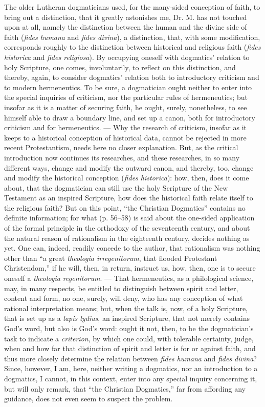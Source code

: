 \documentclass[12pt]{book}
\begin{document}
The older Lutheran dogmaticians used, for the many-sided conception of faith, to bring out a distinction, that it greatly astonishes me, Dr. M. has not touched upon at all, namely
the distinction between the human and the divine side of faith (\textit{fides humana} and \textit{fides divina}), a distinction, that, with some modification, corresponds roughly to the distinction between historical and religious faith (\textit{fides historica} and \textit{fides religiosa}). By occupying oneself with dogmatics' relation to holy Scripture, one comes, involuntarily, to reflect on this distinction, and thereby, again, to consider dogmatics' relation both to introductory criticism and to modern hermeneutics. To be sure, a dogmatician ought neither to enter into the special inquiries of criticism, nor the particular rules of hermeneutics; but insofar as it is a matter of securing faith, he ought, surely, nonetheless, to see himself able to draw a boundary line, and set up a canon, both for introductory criticism and for hermeneutics. --- Why the research of criticism, insofar as it keeps to a historical conception of historical data, cannot be rejected in more recent Protestantism, needs here no closer explanation. But, as the critical introduction now continues its researches, and these researches, in so many different ways, change and modify the outward canon, and thereby, too, change and modify the historical conception (\textit{fides historica}): how, then, does it come about, that the dogmatician can still use the holy Scripture of the New Testament as an inspired Scripture, how does the historical faith relate itself to the religious faith? But on this point, ``the Christian Dogmatics'' contains no definite information; for what (p.
56--58) is said about the one-sided application of the formal principle in the orthodoxy of the seventeenth century, and about the natural reason of rationalism in the eighteenth century, decides nothing as yet. One can, indeed, readily concede to the author, that rationalism was nothing other than ``a great \textit{theologia irregenitorum}, that flooded Protestant Christendom,'' if he will, then, in return, instruct us, how, then, one is to secure oneself a \textit{theologia regenitorum}. --- That hermeneutics, as a philological science, may, in many respects, be entitled to distinguish between spirit and letter, content and form, no one, surely, will deny, who has any conception of what rational interpretation means; but, when the talk is, now, of a holy Scripture, that is set up as a \textit{lapis lydius}, an inspired Scripture, that not merely contains God's word, but also is God's word: ought it not, then, to be the dogmatician's task to indicate a \textit{criterion}, by which one could, with tolerable certainty, judge, when and how far that distinction of spirit and letter is for or against faith, and thus more closely determine the relation between \textit{fides humana} and \textit{fides divina}? Since, however, I am, here, neither writing a dogmatics, nor an introduction to a dogmatics, I cannot, in this context, enter into any special inquiry concerning it, but will only remark, that ``the Christian Dogmatics,'' far from affording any guidance, does not even seem to suspect the problem.
\end{document}
